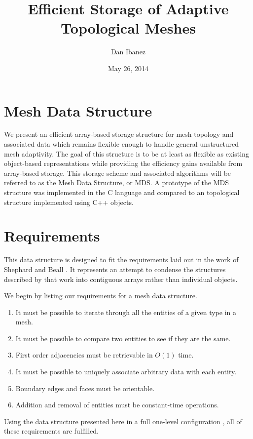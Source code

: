 \documentclass{article}
\title{Efficient Storage of Adaptive Topological Meshes}
\author{Dan Ibanez}
\date{May 26, 2014}
\begin{document}
\maketitle

\section{Mesh Data Structure}

We present an efficient array-based storage structure for mesh
topology and associated data which remains flexible enough
to handle general unstructured mesh adaptivity.
The goal of this structure is to be at least as flexible
as existing object-based representations while providing
the efficiency gains available from array-based storage.
This storage scheme and associated algorithms will be
referred to as the Mesh Data Structure, or MDS.
A prototype of the MDS structure was implemented in the C language
and compared to an topological structure implemented
using C++ objects.

\section{Requirements}
\label{sec:req}

This data structure is designed to fit the requirements
laid out in the work of Shephard and Beall \cite{beall1995mesh}.
It represents an attempt to condense the structures described
by that work into contiguous arrays rather than individual objects.

We begin by listing our requirements for a mesh data structure.

\begin{enumerate}
\item It must be possible to iterate through all the entities of
a given type in a mesh.
\item It must be possible to compare two entities to see if they
are the same.
\item First order adjacencies must be retrievable in $O(1)$ time.
\item It must be possible to uniquely associate arbitrary data with each entity.
\item Boundary edges and faces must be orientable.
\item Addition and removal of entities must be constant-time operations.
\end{enumerate}

Using the data structure presented here in a full one-level configuration
\cite{beall1995mesh},
all of these requirements are fulfilled.
\end{document}
